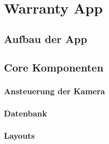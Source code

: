 \chapter{Warranty App}
\label{sec:WarrantyApp}





\section{Aufbau der App}


\section{Core Komponenten}

\subsection{Ansteuerung der Kamera}

\subsection{Datenbank}


\subsection{Layouts}


